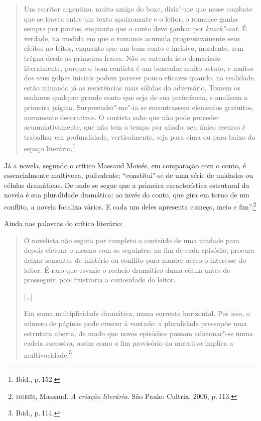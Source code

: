 \begin{quote}
Um escritor argentino, muito amigo do boxe, dizia"-me que nesse combate que se travra entre um texto apaixonante e o leitor, o romance ganha sempre por pontos, enquanto que o conto deve ganhar por \textit{knock"-out}. É verdade, na medida em que o romance acumula progressivamente seus efeitos no leitor, enquanto que um bom conto é incisivo, mordente, sem trégua desde as primeiras frases. Não se entenda isto demasiado literalmente, porque o bom contista é um boxeador muito astuto, e muitos dos seus golpes iniciais podem parecer pouco eficazes quando, na realidade, estão minando já as resistências mais sólidas do adversário.
Tomem os senhores qualquer grande conto que seja de sua preferência, e analisem a primeira página. Surpreender"-me"-ia se encontrassem elementos gratuitos, meramente decorativos. O contista sabe que não pode proceder acumulativamente, que não tem o tempo por aliado; seu único recurso é trabalhar em profundidade, verticalmente, seja para cima ou para baixo do espaço literário.\footnote{Ibid., p.\,152.}
\end{quote}

Já a novela, segundo o crítico Massaud Moisés, em comparação com o conto, é essencialmente multívoca, polivalente: ``constitui"-se de uma série de unidades ou células dramáticas. De onde se segue que a primeira característica estrutural da novela é sua pluralidade dramática: ao invés do conto, que gira em torno de um conflito, a novela focaliza vários. E cada um deles apresenta começo, meio e fim''.\footnote{\textsc{moisés}, Massaud. \textit{A criação literária}. São Paulo: Cultrix, 2006, p.\,113.}

Ainda nas palavras do crítico literário:

\begin{quote}
O novelista não esgota por completo o conteúdo de uma unidade para depois efetuar o mesmo com as seguintes: no fim de cada episódio, procura deixar sementes de mistério ou conflito para manter aceso o interesse do leitor. É raro que esvazie o recheio dramático duma célula antes de prosseguir, pois frustraria a curiosidade do leitor.

{[}\ldots{]}

Em suma multiplicidade dramática, numa corrente horizontal. Por isso, o número de páginas pode crescer à vontade: a pluralidade pressupõe uma estrutura aberta, de modo que novos episódios possam adicionar"-se numa cadeia sucessiva, assim como o fim provisório da narrativa implica a multivocidade.\footnote{Ibid., p.\,114.}
\end{quote}

